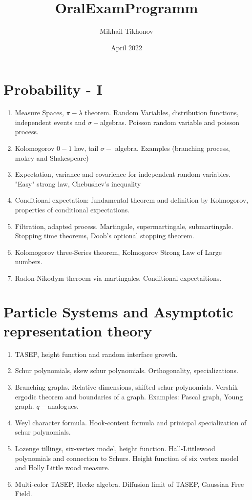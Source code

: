 \documentclass{article}
\title{OralExamProgramm}
\author{Mikhail Tikhonov}
\date{April 2022}
\begin{document}
\maketitle

\section{Probability - I}

\begin{enumerate}
    \item Measure Spaces, $\pi - \lambda$ theorem. Random Variables, distribution functions, independent events and $\sigma-$algebras. Poisson random variable and poisson process.
    \item Kolomogorov $0-1$ law, tail $\sigma-$ algebra. Examples (branching process, mokey and Shakespeare)
    \item Expectation, variance and covarience for independent random variables. "Easy" strong law, Chebushev's inequality
    \item Conditional expectation: fundamental theorem and definition by Kolmogorov, properties of conditional expectations. 
    \item Filtration, adapted process. Martingale, supermartingale, submartingale. Stopping time theorems, Doob's optional stopping theorem.
    \item Kolomogorov three-Series theorem, Kolmogorov Strong Law of Large numbers. 
    \item Radon-Nikodym theroem via martingales. Conditional expectaitions.
\end{enumerate}

\section{Particle Systems and Asymptotic representation theory}
\begin{enumerate}
    \item TASEP, height function and random interface growth. 
    \item Schur polynomials, skew schur polynomials. Orthogonality, specializations.
    \item Branching graphs. Relative dimensions, shifted schur polynomials. Vershik ergodic theorem and boundaries of a graph.  Examples: Pascal graph, Young graph. $q-$analogues.
    \item Weyl character formula. Hook-content formula and prinicpal specialization of schur polynomials.
    \item Lozenge tillings, six-vertex model, height function. Hall-Littlewood polynomials and connection to Schurs. Height function of six vertex model and Holly Little wood measure.
    \item Multi-color TASEP, Hecke algebra. Diffusion limit of TASEP, Gaussian Free Field.
\end{enumerate}
\end{document}
